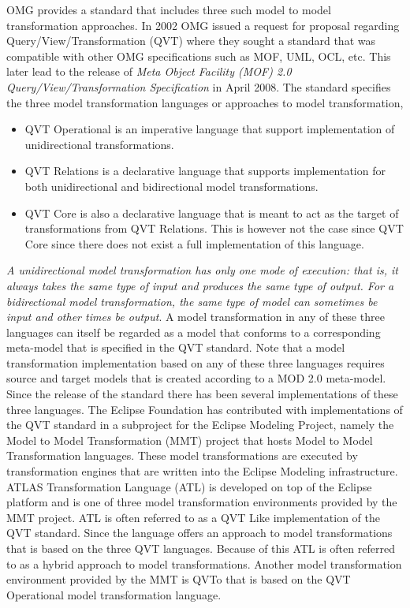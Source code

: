 OMG provides a standard that includes three such model to model transformation
approaches. In 2002 OMG issued a request for proposal regarding
Query/View/Transformation (QVT)\cite{QVT} where they sought a standard that was
compatible with other OMG specifications such as MOF, UML, OCL, etc. This later
lead to the release of \textit{Meta Object Facility (MOF) 2.0
Query/View/Transformation Specification} in April 2008. The standard specifies
the three model transformation languages or approaches to model transformation, 
\begin{itemize}
  \item QVT Operational is an imperative language that support implementation of
  unidirectional transformations.
  \item QVT Relations is a declarative language that supports implementation for
  both unidirectional and bidirectional model transformations.
  \item QVT Core is also a declarative language that is meant to act as the
  target of transformations from QVT Relations. This is however not the case
  since QVT Core since there does not exist a full implementation of this
  language.
\end{itemize}
\textit{A unidirectional model transformation has only one mode of execution:
that is, it always takes the same type of input and produces the same type of
output. For a bidirectional model transformation, the same type of model can
sometimes be input and other times be output}\cite{WikiMT}. A model
transformation in any of these three languages can itself be regarded as a
model that conforms to a corresponding meta-model that is specified in the QVT
standard. Note that a model transformation implementation based on any of
these three languages requires source and target models that is created
according to a MOD 2.0 meta-model. Since the release of the standard there has
been several implementations of these three languages. The Eclipse Foundation
has contributed with implementations of the QVT standard in a subproject for
the Eclipse Modeling Project\cite{EMP}, namely the Model to Model
Transformation (MMT) project that hosts Model to Model Transformation
languages. These model transformations are executed by transformation engines
that are written into the Eclipse Modeling infrastructure. ATLAS Transformation Language
(ATL)\cite{Jouault2008} is developed on top of the Eclipse platform and is one
of three model transformation environments provided by the MMT
project\cite{MMT}. ATL is often referred to as a QVT Like implementation of the
QVT standard. Since the language offers an approach to model transformations
that is based on the three QVT languages. Because of this ATL is often referred
to as a hybrid approach to model transformations. Another model transformation
environment provided by the MMT is QVTo\cite{dvorak2008model} that is based on
the QVT Operational model transformation language.

